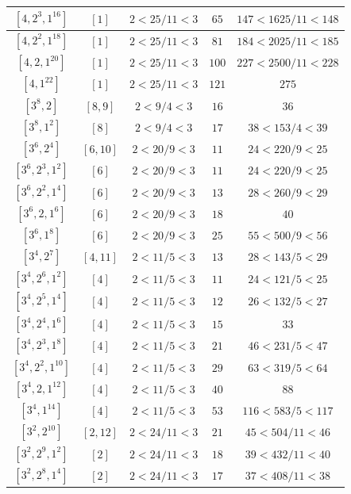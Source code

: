 \documentclass{article}%
\begin{document}
\begin{center}
\begin{longtable}{||c|c|c|c|c||}
$[4, 2^{3}, 1^{16}]$ & $[1]$ & $2 < 25/11 < 3$ & $65$ & $147 < 1625/11 < 148$ \\ \hline 
$[4, 2^{2}, 1^{18}]$ & $[1]$ & $2 < 25/11 < 3$ & $81$ & $184 < 2025/11 < 185$ \\ \hline 
$[4, 2, 1^{20}]$ & $[1]$ & $2 < 25/11 < 3$ & $100$ & $227 < 2500/11 < 228$ \\ \hline 
$[4, 1^{22}]$ & $[1]$ & $2 < 25/11 < 3$ & $121$ & $275$ \\ \hline 
$[3^{8}, 2]$ & $[8, 9]$ & $2 < 9/4 < 3$ & $16$ & $36$ \\ \hline 
$[3^{8}, 1^{2}]$ & $[8]$ & $2 < 9/4 < 3$ & $17$ & $38 < 153/4 < 39$ \\ \hline 
$[3^{6}, 2^{4}]$ & $[6, 10]$ & $2 < 20/9 < 3$ & $11$ & $24 < 220/9 < 25$ \\ \hline 
$[3^{6}, 2^{3}, 1^{2}]$ & $[6]$ & $2 < 20/9 < 3$ & $11$ & $24 < 220/9 < 25$ \\ \hline 
$[3^{6}, 2^{2}, 1^{4}]$ & $[6]$ & $2 < 20/9 < 3$ & $13$ & $28 < 260/9 < 29$ \\ \hline 
$[3^{6}, 2, 1^{6}]$ & $[6]$ & $2 < 20/9 < 3$ & $18$ & $40$ \\ \hline 
$[3^{6}, 1^{8}]$ & $[6]$ & $2 < 20/9 < 3$ & $25$ & $55 < 500/9 < 56$ \\ \hline 
$[3^{4}, 2^{7}]$ & $[4, 11]$ & $2 < 11/5 < 3$ & $13$ & $28 < 143/5 < 29$ \\ \hline 
$[3^{4}, 2^{6}, 1^{2}]$ & $[4]$ & $2 < 11/5 < 3$ & $11$ & $24 < 121/5 < 25$ \\ \hline 
$[3^{4}, 2^{5}, 1^{4}]$ & $[4]$ & $2 < 11/5 < 3$ & $12$ & $26 < 132/5 < 27$ \\ \hline 
$[3^{4}, 2^{4}, 1^{6}]$ & $[4]$ & $2 < 11/5 < 3$ & $15$ & $33$ \\ \hline 
$[3^{4}, 2^{3}, 1^{8}]$ & $[4]$ & $2 < 11/5 < 3$ & $21$ & $46 < 231/5 < 47$ \\ \hline 
$[3^{4}, 2^{2}, 1^{10}]$ & $[4]$ & $2 < 11/5 < 3$ & $29$ & $63 < 319/5 < 64$ \\ \hline 
$[3^{4}, 2, 1^{12}]$ & $[4]$ & $2 < 11/5 < 3$ & $40$ & $88$ \\ \hline 
$[3^{4}, 1^{14}]$ & $[4]$ & $2 < 11/5 < 3$ & $53$ & $116 < 583/5 < 117$ \\ \hline 
$[3^{2}, 2^{10}]$ & $[2, 12]$ & $2 < 24/11 < 3$ & $21$ & $45 < 504/11 < 46$ \\ \hline 
$[3^{2}, 2^{9}, 1^{2}]$ & $[2]$ & $2 < 24/11 < 3$ & $18$ & $39 < 432/11 < 40$ \\ \hline 
$[3^{2}, 2^{8}, 1^{4}]$ & $[2]$ & $2 < 24/11 < 3$ & $17$ & $37 < 408/11 < 38$ \\ \hline 

\end{longtable}
\end{center}
\end{document}
